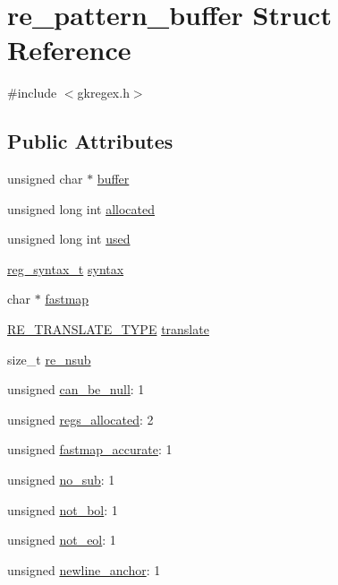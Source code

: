 \hypertarget{a00686}{}\section{re\+\_\+pattern\+\_\+buffer Struct Reference}
\label{a00686}


{\ttfamily \#include $<$gkregex.\+h$>$}

\subsection*{Public Attributes}
\begin{DoxyCompactItemize}
\item 
unsigned char $\ast$ \hyperlink{a00686_ae60c7055854785bf6e2743fd314fcb83}{buffer}
\item 
unsigned long int \hyperlink{a00686_a2947439f970297ce6f4a439867c0b5c7}{allocated}
\item 
unsigned long int \hyperlink{a00686_a5c6bb086f4bfebee8aa4373c03bcc74b}{used}
\item 
\hyperlink{a00092_a7e0565199a2fabaca3d67a5a44fc4229}{reg\+\_\+syntax\+\_\+t} \hyperlink{a00686_aa16e95a1befa7d5fd8eb89542fa065f8}{syntax}
\item 
char $\ast$ \hyperlink{a00686_a103ac216c8fd6a8734daa4999fca3efb}{fastmap}
\item 
\hyperlink{a00092_a96c9fb9c7074cb21740b63092b0637a4}{R\+E\+\_\+\+T\+R\+A\+N\+S\+L\+A\+T\+E\+\_\+\+T\+Y\+PE} \hyperlink{a00686_a780f81d1ec1ebba869e138b5bc849658}{translate}
\item 
size\+\_\+t \hyperlink{a00686_a703c2069a09bac7fa67de8871cb17d35}{re\+\_\+nsub}
\item 
unsigned \hyperlink{a00686_a13807f7bf4b32d786eb9e17a3c4d3124}{can\+\_\+be\+\_\+null}\+: 1
\item 
unsigned \hyperlink{a00686_a83388321c434be6ac33fe359a3d7b449}{regs\+\_\+allocated}\+: 2
\item 
unsigned \hyperlink{a00686_a837b026312b860e5485da6240b10d8f7}{fastmap\+\_\+accurate}\+: 1
\item 
unsigned \hyperlink{a00686_a83e122c96edb258aa4ef99d7a8b2bfa2}{no\+\_\+sub}\+: 1
\item 
unsigned \hyperlink{a00686_a4a5d480a0891afbab92cf486a04e4a68}{not\+\_\+bol}\+: 1
\item 
unsigned \hyperlink{a00686_a875954f4e64b585471f67b334d33799c}{not\+\_\+eol}\+: 1
\item 
unsigned \hyperlink{a00686_a46ed7a16b4cb87267ac5d219dab3536a}{newline\+\_\+anchor}\+: 1
\end{DoxyCompactItemize}


